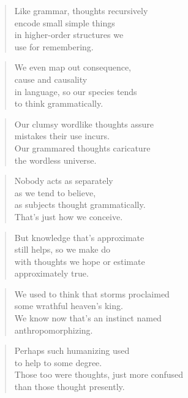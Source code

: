 \documentclass[10pt,a4paper]{article}
\begin{document}
\begin{multicols}{2}
\begin{verse}
Like grammar, thoughts recursively\\
encode small simple things\\
in higher-order structures we\\
use for remembering.
\end{verse}

\begin{verse}
We even map out consequence,\\
cause and causality\\
in language, so our species tends\\
to think grammatically.
\end{verse}

\begin{verse}
Our clumsy wordlike thoughts assure\\
mistakes their use incurs.\\
Our grammared thoughts caricature\\
the wordless universe.
\end{verse}

\begin{verse}
Nobody acts as separately\\
as we tend to believe,\\
as subjects thought grammatically.\\
That’s just how we conceive.
\end{verse}

\begin{verse}
But knowledge that’s approximate\\
still helps, so we make do\\
with thoughts we hope or estimate\\
approximately true.
\end{verse}

\begin{verse}
We used to think that storms proclaimed\\
some wrathful heaven’s king.\\
We know now that’s an instinct named\\
anthropomorphizing.
\end{verse}

\begin{verse}
Perhaps such humanizing used\\
to help to some degree.\\
Those too were thoughts, just more confused\\
than those thought presently.
\end{verse}


\end{multicols}
\end{document}
